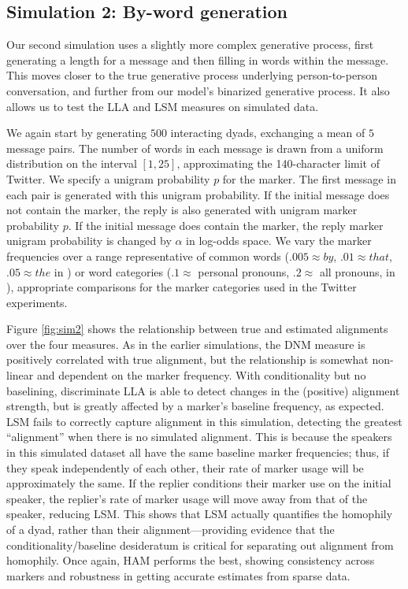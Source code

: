 \documentclass{acm_proc_article-sp}
\begin{document}
\subsection{Simulation 2: By-word generation}
Our second simulation uses a slightly more complex generative process, first generating a length for a message and then filling in words within the message.  This moves closer to the true generative process underlying person-to-person conversation, and further from our model's binarized generative process.  It also allows us to test the LLA and LSM measures on simulated data.

We again start by generating $500$ interacting dyads, exchanging a mean of $5$ message pairs. The number of words in each message is drawn from a uniform distribution on the interval $[1,25]$, approximating the 140-character limit of Twitter. We specify a unigram probability $p$ for the marker. The first message in each pair is generated with this unigram probability.  If the initial message does not contain the marker, the reply is also generated with unigram marker probability $p$. If the initial message does contain the marker, the reply marker unigram probability is changed by $\alpha$ in log-odds space.  We vary the marker frequencies over a range representative of common words ($.005 \approx by$, $.01 \approx that$, $.05 \approx the$ in \cite{Brown}) or word categories ($.1 \approx $ personal pronouns, $.2 \approx $ all pronouns, in \cite{KacewiczEtAl2013}), appropriate comparisons for the marker categories used in the Twitter experiments.

Figure \ref{fig:sim2} shows the relationship between true and estimated alignments over the four measures. As in the earlier simulations, the DNM measure is positively correlated with true alignment, but the relationship is somewhat non-linear and dependent on the marker frequency.  With conditionality but no baselining, discriminate LLA is able to detect changes in the (positive) alignment strength, but is greatly affected by a marker's baseline frequency, as expected. LSM fails to correctly capture alignment in this simulation, detecting the greatest ``alignment'' when there is no simulated alignment.  This is because the speakers in this simulated dataset all have the same baseline marker frequencies; thus, if they speak independently of each other, their rate of marker usage will be approximately the same. If the replier conditions their marker use on the initial speaker, the replier's rate of marker usage will move away from that of the speaker, reducing LSM.  This shows that LSM actually quantifies the homophily of a dyad, rather than their alignment---providing evidence that the conditionality/baseline desideratum is critical for separating out alignment from homophily. Once again, HAM performs the best, showing consistency across markers and robustness in getting accurate estimates from sparse data. 
\end{document}

